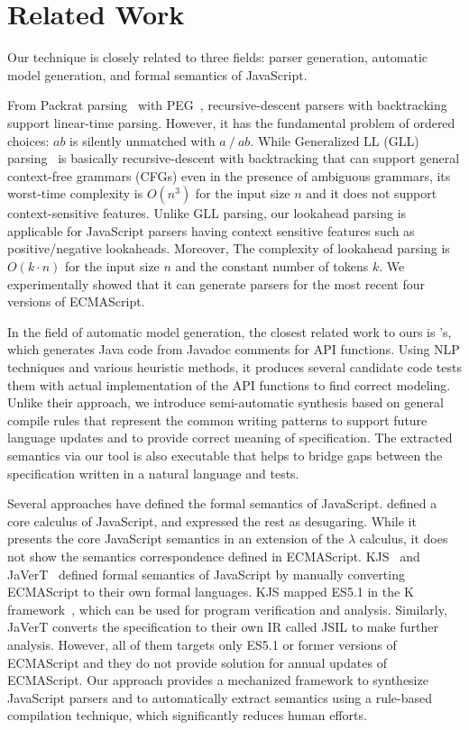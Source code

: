 \section{Related Work}\label{sec:related}
Our technique is closely related to three fields: parser generation,
automatic model generation, and formal semantics of JavaScript.

From Packrat parsing~\cite{packrat} with PEG~\cite{peg}, recursive-descent
parsers with backtracking support linear-time parsing.  However, it
has the fundamental problem of ordered choices: \( ab \) is silently
unmatched with \( a ~/~ ab \).  While Generalized LL (GLL) parsing~\cite{gll}
is basically recursive-descent with backtracking that can support general
context-free grammars (CFGs) even in the presence of ambiguous grammars,
its worst-time complexity is \( O(n^3) \) for the input size \( n \) and it
does not support context-sensitive features.  Unlike GLL parsing, our lookahead
parsing is applicable for JavaScript parsers having context sensitive features
such as positive/negative lookaheads. Moreover, The complexity of lookahead
parsing is \( O(k \cdot n) \) for the input size \( n \) and the constant
number of tokens \( k \). We experimentally showed that it can generate parsers
for the most recent four versions of ECMAScript.

In the field of automatic model generation, the closest related work to
ours is \citet{javadoc}'s, which generates Java code from Javadoc comments
for API functions.  Using NLP techniques and various heuristic methods,
it produces several candidate code tests them with actual implementation
of the API functions to find correct modeling.  Unlike their approach, we
introduce semi-automatic synthesis based on general compile rules that
represent the common writing patterns to support future language updates and to
provide correct meaning of specification.  The extracted semantics via our tool
is also executable that helps to bridge gaps between the specification written
in a natural language and tests.

Several approaches have defined the formal semantics of JavaScript.
\citet{lambdajs} defined a core calculus of JavaScript, and expressed the
rest as desugaring.  While it presents the core JavaScript semantics in
an extension of the $\lambda$ calculus, it does not show the semantics
correspondence defined in ECMAScript.  KJS~\cite{kjs} and
JaVerT~\cite{javert} defined formal semantics of JavaScript by manually converting
ECMAScript to their own formal languages.  KJS mapped
ES5.1 in the K framework~\cite{kframework}, which can be used
for program verification and analysis.  Similarly, JaVerT converts the
specification to their own IR called JSIL to make further analysis.
However, all of them targets only ES5.1 or former versions of ECMAScript and
they do not provide solution for annual updates of ECMAScript. Our approach
provides a mechanized framework to synthesize JavaScript parsers and to
automatically extract semantics using a rule-based compilation technique, which
significantly reduces human efforts.
